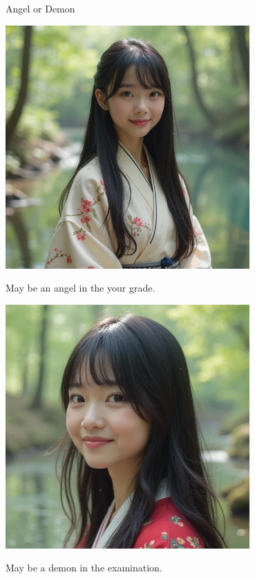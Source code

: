 \documentclass{beamer}
\begin{document}
\begin{frame}{Angel or Demon}
\begin{minipage}{0.45\textwidth}
\begin{center}
\includegraphics[width=0.7\textwidth]{heal.png}
\end{center}
\begin{center}
May be an angel in the your grade.
\end{center}
\end{minipage}
\hfill
\begin{minipage}{0.45\textwidth}
\begin{center}
\includegraphics[width=0.7\textwidth]{kill.png}
\end{center}
\begin{center}
May be a demon in the examination.
\end{center}
\end{minipage}
\end{frame}
\end{document}
